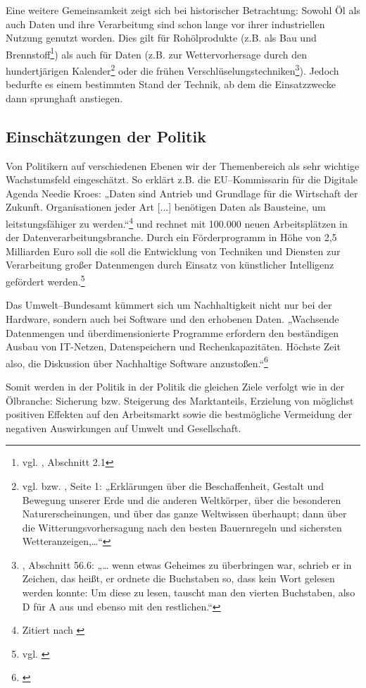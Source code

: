 Eine weitere Gemeinsamkeit zeigt sich bei historischer Betrachtung: Sowohl Öl als auch Daten und ihre Verarbeitung sind schon lange vor ihrer industriellen Nutzung genutzt worden. Dies gilt für Rohölprodukte (z.B. als Bau und Brennstoff\footnote{vgl. \cite{pressler}, Abschnitt 2.1}) als auch für Daten (z.B. zur Wettervorhersage durch den hundertjärigen Kalender\footnote{vgl. \cite{dwd} bzw. \cite{knauer100}, Seite 1: „Erklärungen über die Beschaffenheit, Gestalt und Bewegung unserer Erde und die anderen Weltkörper, über die besonderen Naturerscheinungen, und über das ganze Weltwissen überhaupt; dann über die Witterungsvorhersagung nach den besten Bauernregeln und sichersten Wetteranzeigen,…“} oder die frühen Verschlüselungstechniken\footnote{\cite{suetonius}, Abschnitt 56.6: „… wenn etwas Geheimes zu überbringen war, schrieb er in Zeichen, das heißt, er ordnete die Buchstaben so, dass kein Wort gelesen werden konnte: Um diese zu lesen, tauscht man den vierten Buchstaben, also D für A aus und ebenso mit den restlichen.“}). Jedoch bedurfte es einem bestimmten Stand der Technik, ab dem die Einsatzzwecke dann sprunghaft anstiegen.

\subsection{Einschätzungen der Politik}
\label{politik}

Von Politikern auf verschiedenen Ebenen wir der Themenbereich  als sehr wichtige Wachstumsfeld eingeschätzt. So erklärt z.B. die EU--Kommissarin für die Digitale Agenda Needie Kroes: „Daten sind Antrieb und Grundlage für die Wirtschaft der Zukunft. Organisationen jeder Art [...] benötigen Daten als Bausteine, um leitstungsfähiger zu werden.“\footnote{Zitiert nach \cite{bd25}} und rechnet mit 100.000 neuen Arbeitsplätzen in der Datenverarbeitungsbranche. Durch ein Förderprogramm in Höhe von 2,5 Milliarden Euro soll die soll die Entwicklung von Techniken und Diensten zur Verarbeitung großer Datenmengen durch Einsatz von künstlicher Intelligenz gefördert werden.\footnote{vgl. \cite{bd25}}

Das Umwelt--Bundesamt kümmert sich um Nachhaltigkeit nicht nur bei der Hardware, sondern auch bei Software und den erhobenen Daten. „Wachsende Datenmengen und überdimensionierte Programme erfordern den beständigen Ausbau von IT-Netzen, Datenspeichern und Rechenkapazitäten. Höchste Zeit also, die Diskussion über Nachhaltige Software anzustoßen.“\footnote{\cite{fns}} 

Somit werden in der Politik in der Politik die gleichen Ziele verfolgt wie in der Ölbranche: Sicherung bzw. Steigerung des Marktanteils, Erzielung von möglichst positiven Effekten auf den Arbeitsmarkt sowie die bestmögliche Vermeidung der negativen Auswirkungen auf Umwelt und Gesellschaft.